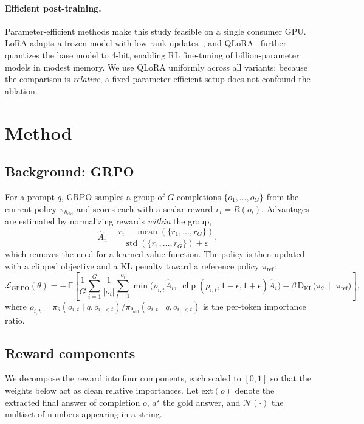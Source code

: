 \documentclass[11pt]{article}
\begin{document}
\paragraph{Efficient post-training.}
Parameter-efficient methods make this study feasible on a single consumer GPU.
LoRA adapts a frozen model with low-rank updates~\citep{lora}, and
QLoRA~\citep{qlora} further quantizes the base model to 4-bit, enabling
RL fine-tuning of billion-parameter models in modest memory. We use QLoRA
uniformly across all variants; because the comparison is \emph{relative}, a
fixed parameter-efficient setup does not confound the ablation.

\section{Method}
\label{sec:method}

\subsection{Background: GRPO}
For a prompt $q$, GRPO samples a group of $G$ completions
$\{o_1,\dots,o_G\}$ from the current policy $\pi_{\theta_{\text{old}}}$ and scores
each with a scalar reward $r_i = R(o_i)$. Advantages are estimated by normalizing
rewards \emph{within} the group,
\begin{equation}
  \hat{A}_i = \frac{r_i - \operatorname{mean}(\{r_1,\dots,r_G\})}
                   {\operatorname{std}(\{r_1,\dots,r_G\}) + \varepsilon},
\end{equation}
which removes the need for a learned value function. The policy is then updated
with a clipped objective and a KL penalty toward a reference policy
$\pi_{\text{ref}}$:
\begin{equation}
  \mathcal{L}_{\text{GRPO}}(\theta) =
  -\,\mathbb{E}\!\left[
  \frac{1}{G}\sum_{i=1}^{G}\frac{1}{|o_i|}\sum_{t=1}^{|o_i|}
  \min\!\big(\rho_{i,t}\hat{A}_i,\;
  \operatorname{clip}(\rho_{i,t}, 1-\epsilon, 1+\epsilon)\hat{A}_i\big)
  - \beta\, \mathrm{D}_{\mathrm{KL}}\!\big(\pi_\theta \,\|\, \pi_{\text{ref}}\big)
  \right],
\end{equation}
where $\rho_{i,t} = \pi_\theta(o_{i,t}\mid q, o_{i,<t}) /
\pi_{\theta_{\text{old}}}(o_{i,t}\mid q, o_{i,<t})$ is the per-token importance
ratio.

\subsection{Reward components}
We decompose the reward into four components, each scaled to $[0,1]$ so that the
weights below act as clean relative importances. Let $\mathrm{ext}(o)$ denote the
extracted final answer of completion $o$, $a^\star$ the gold answer, and
$\mathcal{N}(\cdot)$ the multiset of numbers appearing in a string.
\end{document}

